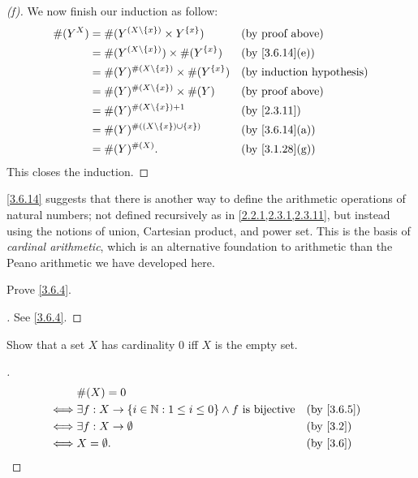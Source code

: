\begin{proof}[(f)]
	We now finish our induction as follow:
	\begin{align*}
		\#(Y^X) & = \#(Y^{(X \setminus \set{x})} \times Y^{\set{x}})       &  & \text{(by proof above)}      \\
		        & = \#(Y^{(X \setminus \set{x})}) \times \#(Y^{\set{x}})   &  & \text{(by \cref{3.6.14}(e))} \\
		        & = \#(Y)^{\#(X \setminus \set{x})} \times \#(Y^{\set{x}}) &  & \byIH                        \\
		        & = \#(Y)^{\#(X \setminus \set{x})} \times \#(Y)           &  & \text{(by proof above)}      \\
		        & = \#(Y)^{\#(X \setminus \set{x}) + 1}                    &  & \by{2.3.11}                  \\
		        & = \#(Y)^{\#((X \setminus \set{x}) \cup \set{x})}         &  & \text{(by \cref{3.6.14}(a))} \\
		        & = \#(Y)^{\#(X)}.                                         &  & \text{(by \cref{3.1.28}(g))}
	\end{align*}
	This closes the induction.
\end{proof}

\begin{rmk}\label{3.6.15}
	\cref{3.6.14} suggests that there is another way to define the arithmetic operations of natural numbers;
	not defined recursively as in \cref{2.2.1,2.3.1,2.3.11}, but instead using the notions of union, Cartesian product, and power set.
	This is the basis of \emph{cardinal arithmetic}, which is an alternative foundation to arithmetic than the Peano arithmetic we have developed here.
\end{rmk}

\exercisesection

\begin{ex}\label{ex:3.6.1}
	Prove \cref{3.6.4}.
\end{ex}

\begin{proof}[]
	See \cref{3.6.4}.
\end{proof}

\begin{ex}\label{ex:3.6.2}
	Show that a set \(X\) has cardinality \(0\) iff \(X\) is the empty set.
\end{ex}

\begin{proof}[]
	\begin{align*}
		     & \#(X) = 0                                                                                       \\
		\iff & \exists f : X \to \set{i \in \N : 1 \leq i \leq 0} \land f \text{ is bijective} &  & \by{3.6.5} \\
		\iff & \exists f : X \to \emptyset                                                     &  & \by{3.2}   \\
		\iff & X = \emptyset.                                                                  &  & \by{3.6}
	\end{align*}
\end{proof}

